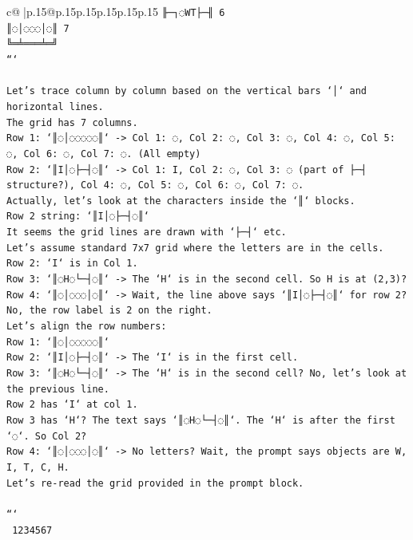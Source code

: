 \documentclass{article}
\begin{document}
{\begin{supertabular}{c@{$\;$}|p{.15\linewidth}@{}p{.15\linewidth}p{.15\linewidth}p{.15\linewidth}p{.15\linewidth}p{.15\linewidth}}
{{{\texttt{╟─┐◌WT├─╢ 6} \\
\texttt{║◌│◌◌◌│◌║ 7} \\
\texttt{╚═╧═══╧═╝} \\
\texttt{```} \\
\\ 
\texttt{Let's trace column by column based on the vertical bars `│` and horizontal lines.} \\
\texttt{The grid has 7 columns.} \\
\texttt{Row 1: `║◌│◌◌◌◌◌║` {-}> Col 1: ◌, Col 2: ◌, Col 3: ◌, Col 4: ◌, Col 5: ◌, Col 6: ◌, Col 7: ◌. (All empty)} \\
\texttt{Row 2: `║I│◌├─┤◌║` {-}> Col 1: I, Col 2: ◌, Col 3: ◌ (part of ├─┤ structure?), Col 4: ◌, Col 5: ◌, Col 6: ◌, Col 7: ◌.} \\
\texttt{Actually, let's look at the characters inside the `║` blocks.} \\
\texttt{Row 2 string: `║I│◌├─┤◌║`} \\
\texttt{It seems the grid lines are drawn with `├─┤` etc.} \\
\texttt{Let's assume standard 7x7 grid where the letters are in the cells.} \\
\texttt{Row 2: `I` is in Col 1.} \\
\texttt{Row 3: `║◌H◌└─┤◌║` {-}> The `H` is in the second cell. So H is at (2,3)?} \\
\texttt{Row 4: `║◌│◌◌◌│◌║` {-}> Wait, the line above says `║I│◌├─┤◌║` for row 2? No, the row label is 2 on the right.} \\
\texttt{Let's align the row numbers:} \\
\texttt{Row 1: `║◌│◌◌◌◌◌║`} \\
\texttt{Row 2: `║I│◌├─┤◌║` {-}> The `I` is in the first cell.} \\
\texttt{Row 3: `║◌H◌└─┤◌║` {-}> The `H` is in the second cell? No, let's look at the previous line.} \\
\texttt{Row 2 has `I` at col 1.} \\
\texttt{Row 3 has `H`? The text says `║◌H◌└─┤◌║`. The `H` is after the first `◌`. So Col 2?} \\
\texttt{Row 4: `║◌│◌◌◌│◌║` {-}> No letters? Wait, the prompt says objects are W, I, T, C, H.} \\
\texttt{Let's re{-}read the grid provided in the prompt block.} \\
\\ 
\texttt{```} \\
\texttt{ 1234567} \\
}}}
\end{supertabular}}
\end{document}
